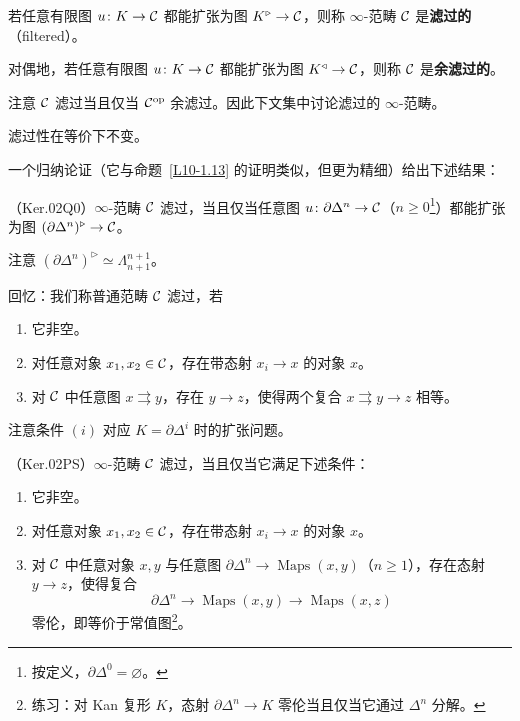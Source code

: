 \begin{definition}\label{L10-2.1}
若任意有限图 $u\colon K\to\mathcal{C}$ 都能扩张为图 $K^{\triangleright}\to\mathcal{C}$，则称 $\infty$-范畴 $\mathcal{C}$ 是\textbf{滤过的}（filtered）。

对偶地，若任意有限图 $u\colon K\to\mathcal{C}$ 都能扩张为图 $K^{\triangleleft}\to\mathcal{C}$，则称 $\mathcal{C}$ 是\textbf{余滤过的}。
\end{definition}

\nitem\label{L10-2.2} 注意 $\mathcal{C}$ 滤过当且仅当 $\mathcal{C}^{\mathrm{op}}$ 余滤过。因此下文集中讨论滤过的 $\infty$-范畴。

\begin{exercise}\label{L10-2.3}
滤过性在等价下不变。
\end{exercise}

\nitem\label{L10-2.4} 一个归纳论证（它与命题~\ref{L10-1.13} 的证明类似，但更为精细）给出下述结果：

\begin{lemma}\label{L10-2.5}
（Ker.02Q0）$\infty$-范畴 $\mathcal{C}$ 滤过，当且仅当任意图 $u\colon\partial\Delta^n\to\mathcal{C}$（$n\ge 0$\footnote{按定义，$\partial\Delta^0=\varnothing$。}）都能扩张为图 $(\partial\Delta^n)^{\triangleright}\to\mathcal{C}$。
\end{lemma}

\begin{remark}\label{L10-2.6}
注意 $(\partial\Delta^n)^{\triangleright}\simeq\Lambda^{n+1}_{n+1}$。
\end{remark}

\nitem\label{L10-2.7} 回忆：我们称普通范畴 $\mathcal{C}$ 滤过，若
\begin{enumerate}[label=(\arabic*),leftmargin=2.4em,itemsep=0.1em,start=0]
\item 它非空。
\item 对任意对象 $x_1,x_2\in\mathcal{C}$，存在带态射 $x_i\to x$ 的对象 $x$。
\item 对 $\mathcal{C}$ 中任意图 $x\rightrightarrows y$，存在 $y\to z$，使得两个复合 $x\rightrightarrows y\to z$ 相等。
\end{enumerate}
注意条件 $(i)$ 对应 $K=\partial\Delta^i$ 时的扩张问题。

\begin{proposition}\label{L10-2.8}
（Ker.02PS）$\infty$-范畴 $\mathcal{C}$ 滤过，当且仅当它满足下述条件：
\begin{enumerate}[label=(\arabic*),leftmargin=2.4em,itemsep=0.1em,start=0]
\item 它非空。
\item 对任意对象 $x_1,x_2\in\mathcal{C}$，存在带态射 $x_i\to x$ 的对象 $x$。
\item 对 $\mathcal{C}$ 中任意对象 $x,y$ 与任意图 $\partial\Delta^n\to\operatorname{Maps}(x,y)$（$n\ge 1$），存在态射 $y\to z$，使得复合
\[
\partial\Delta^n\to\operatorname{Maps}(x,y)\to\operatorname{Maps}(x,z)
\]
零伦，即等价于常值图\footnote{练习：对 Kan 复形 $K$，态射 $\partial\Delta^n\to K$ 零伦当且仅当它通过 $\Delta^n$ 分解。}。
\end{enumerate}
\end{proposition}

